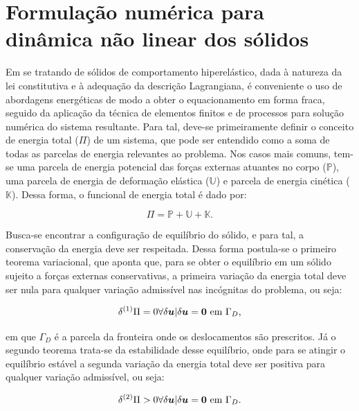 \chapter{Formulação numérica para dinâmica não linear dos sólidos} \label{EGDS}

Em se tratando de sólidos de comportamento hiperelástico, dada à natureza da lei constitutiva e à adequação da descrição Lagrangiana, é conveniente o uso de abordagens energéticas de modo a obter o equacionamento em forma fraca, seguido da aplicação da técnica de elementos finitos e de processos para solução numérica do sistema resultante. Para tal, deve-se primeiramente definir o conceito de energia total ($\Pi$) de um sistema, que pode ser entendido como a soma de todas as parcelas de energia relevantes ao problema. Nos casos mais comuns, tem-se uma parcela de energia potencial das forças externas atuantes no corpo ($\mathbb{P}$), uma parcela de energia de deformação elástica ($\mathbb{U}$) e parcela de energia cinética ($\mathbb{K}$). Dessa forma, o funcional de energia total é dado por:

\begin{equation}
    \Pi=\mathbb{P}+\mathbb{U}+\mathbb{K}\text{.}
    \label{FuncionalEnergia}
\end{equation}

Busca-se encontrar a configuração de equilíbrio do sólido, e para tal, a conservação da energia deve ser respeitada. Dessa forma postula-se o primeiro teorema variacional, que aponta que, para se obter o equilíbrio em um sólido sujeito a forças externas conservativas, a primeira variação da energia total deve ser nula para qualquer variação admissível nas incógnitas do problema, ou seja:

\begin{equation}
    \delta^{(1)}\Pi=0\forall\delta\boldsymbol{u}|\delta\boldsymbol{u}=\boldsymbol{0}\text{ em }\Gamma_D\text{,}
\end{equation}

\noindent em que $\Gamma_D$ é a parcela da fronteira onde os deslocamentos são prescritos. Já o segundo teorema trata-se da estabilidade desse equilíbrio, onde para se atingir o equilíbrio estável a segunda variação da energia total deve ser positiva para qualquer variação admissível, ou seja:

\begin{equation}
    \delta^{(2)}\Pi>0\forall\delta\boldsymbol{u}|\delta\boldsymbol{u}=\boldsymbol{0}\text{ em }\Gamma_D\text{.}
\end{equation}

